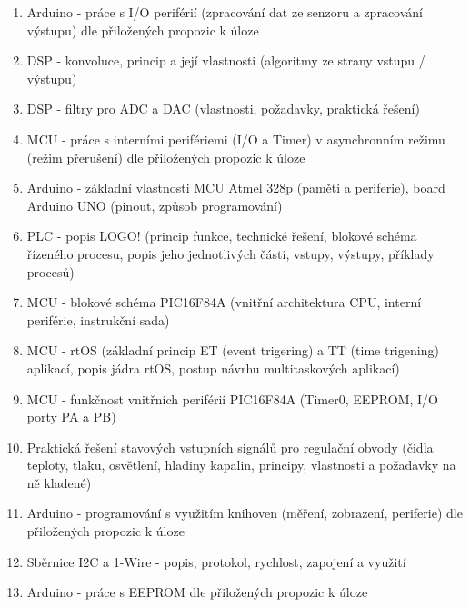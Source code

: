 \documentclass[11pt]{article}
\begin{document}
\begin{enumerate}
            \item Arduino - práce s I/O periférií (zpracování dat ze senzoru a zpracování výstupu) dle přiložených propozic k úloze
            \item DSP - konvoluce, princip a její vlastnosti (algoritmy ze strany vstupu / výstupu)
            \item DSP - filtry pro ADC a DAC (vlastnosti, požadavky, praktická řešení)
            \item MCU - práce s interními perifériemi (I/O a Timer) v asynchronním režimu (režim přerušení) dle přiložených propozic k úloze
            \item Arduino - základní vlastnosti MCU Atmel 328p (paměti a periferie), board Arduino UNO (pinout, způsob programování)
            \item PLC - popis LOGO! (princip funkce, technické řešení, blokové schéma řízeného procesu, popis jeho jednotlivých částí, vstupy, výstupy, příklady procesů)
            \item MCU - blokové schéma PIC16F84A (vnitřní architektura CPU, interní periférie, instrukční sada)
            \item MCU - rtOS (základní princip ET (event trigering) a TT (time trigening) aplikací, popis jádra rtOS, postup návrhu multitaskových aplikací)
            \item MCU - funkčnost vnitřních periférií PIC16F84A (Timer0, EEPROM, I/O porty PA a PB)
            \item Praktická řešení stavových vstupních signálů pro regulační obvody (čidla teploty, tlaku, osvětlení, hladiny kapalin, principy, vlastnosti a požadavky na ně kladené)
            \item Arduino - programování s využitím knihoven (měření, zobrazení, periferie) dle přiložených propozic k úloze
            \item Sběrnice I2C a 1-Wire - popis, protokol, rychlost, zapojení a využití
            \item Arduino - práce s EEPROM dle přiložených propozic k úloze
        \end{enumerate}
\end{document}
